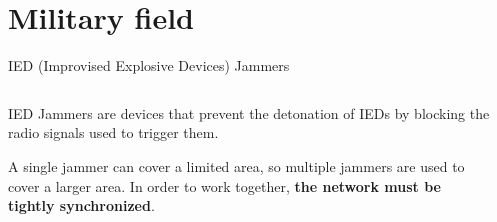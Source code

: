 \section{Military field}


\begin{frame}{IED (Improvised Explosive Devices) Jammers}

    \begin{columns}[c, onlytextwidth]

        \begin{column}{0.5\textwidth}

            IED Jammers are devices that prevent the detonation of IEDs by blocking the radio signals used to trigger them.

            \vspace{10pt}

            A single jammer can cover a limited area, so multiple jammers are used to cover a larger area.
            In order to work together, \textbf{the network must be tightly synchronized}.

        \end{column}

        \hfill

        \begin{column}{0.45\textwidth}


\end{column}
\end{columns}
\end{frame}
